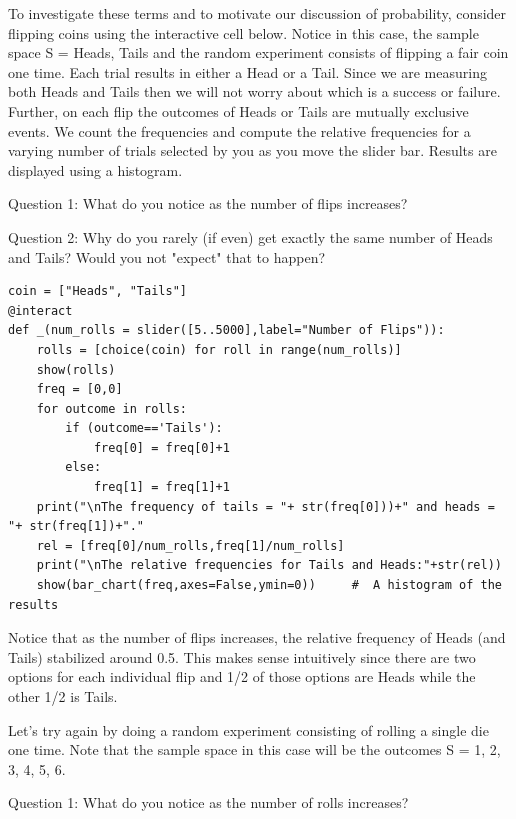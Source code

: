 \documentclass[10pt,]{book}
\theoremstyle{plain}
\theoremstyle{definition}
\theoremstyle{definition}
\theoremstyle{definition}
\numberwithin{equation}{section}
\begin{document}
\par
To investigate these terms and to motivate our discussion of probability, consider flipping coins using the interactive cell below. Notice in this case, the sample space S = {Heads, Tails} and the random experiment consists of flipping a fair coin one time. Each trial results in either a Head or a Tail. Since we are measuring both Heads and Tails then we will not worry about which is a success or failure. Further, on each flip the outcomes of Heads or Tails are mutually exclusive events. We count the frequencies and compute the relative frequencies for a varying number of trials selected by you as you move the slider bar. Results are displayed using a histogram.%
\par

	Question 1: What do you notice as the number of flips increases?
\par

	Question 2: Why do you rarely (if even) get exactly the same number of Heads and Tails? Would you not "expect"
	that to happen?
\begin{lstlisting}[style=sageinput]
coin = ["Heads", "Tails"]
@interact
def _(num_rolls = slider([5..5000],label="Number of Flips")):
	rolls = [choice(coin) for roll in range(num_rolls)]
	show(rolls)   
	freq = [0,0]
	for outcome in rolls:
		if (outcome=='Tails'):
			freq[0] = freq[0]+1
		else:
			freq[1] = freq[1]+1
	print("\nThe frequency of tails = "+ str(freq[0]))+" and heads = "+ str(freq[1])+"."
	rel = [freq[0]/num_rolls,freq[1]/num_rolls]
	print("\nThe relative frequencies for Tails and Heads:"+str(rel))
	show(bar_chart(freq,axes=False,ymin=0))     #  A histogram of the results
\end{lstlisting}
\par
Notice that as the number of flips increases, the relative frequency of Heads (and Tails)
	stabilized around 0.5. This makes sense intuitively since there are two options for each 
	individual flip and 1/2 of those options are Heads while the other 1/2 is Tails.%
\par

	Let's try again
	by doing a random experiment consisting of rolling a single die one time. Note that the sample space 
	in this case will be the outcomes S = {1, 2, 3, 4, 5, 6}.
\par

	Question 1: What do you notice as the number of rolls increases?
\par
\end{document}
